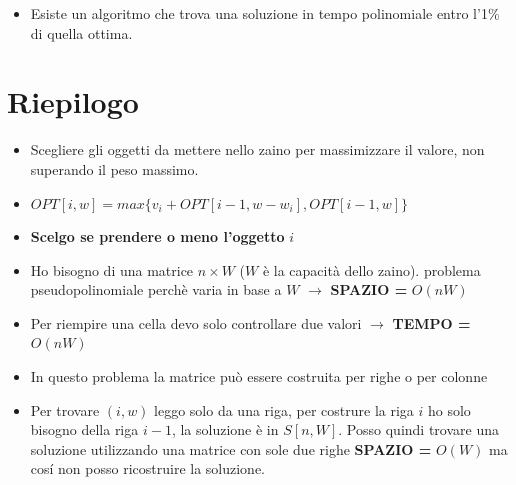 \begin{itemize}
  \item
        Esiste un algoritmo che trova una soluzione in tempo polinomiale entro
        l'1\% di quella ottima.
\end{itemize}

\section{Riepilogo}

\begin{itemize}
  \item
        Scegliere gli oggetti da mettere nello zaino per massimizzare il
        valore, non superando il peso massimo.
  \item
        $OPT[i,w] = max\{ v_i + OPT[i-1, w-w_i], OPT[i-1,w] \}$
  \item
        \textbf{Scelgo se prendere o meno l'oggetto} $i$
  \item
        Ho bisogno di una matrice $n \times W$ ($W$ è la capacità dello
        zaino). problema pseudopolinomiale perchè varia in base a $W$
        $\rightarrow$ \textbf{SPAZIO =} $O(nW)$
  \item
        Per riempire una cella devo solo controllare due valori
        $\rightarrow$ \textbf{TEMPO =} $O(nW)$
  \item
        In questo problema la matrice può essere costruita per righe o per
        colonne
  \item
        Per trovare $(i,w)$ leggo solo da una riga, per costrure la riga
        $i$ ho solo bisogno della riga $i-1$, la soluzione è in
        $S[n,W]$. Posso quindi trovare una soluzione utilizzando una matrice
        con sole due righe \textbf{SPAZIO =} $O(W)$ ma cosí non posso
        ricostruire la soluzione.
\end{itemize}
